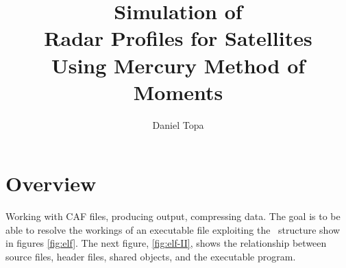 \documentclass[10pt, oneside]{article}   	%
\title{Simulation of \\Radar Profiles for Satellites \\Using Mercury Method of Moments}
\author{Daniel Topa\\\TopaHIIEmail}
\affil{\hiiafil}
\begin{document}
\maketitle
{}
\tableofcontents

\section{Overview}
\cite{topa20200303}
Working with CAF files, producing output, compressing data.
\cite{topa-4-20-2024}
\cite{topa-4-20-2024}
The goal is to be able to resolve the workings of an executable file exploiting the \elf \ structure show in figures \ref{fig:elf}. The next figure, \ref{fig:elf-II}, shows the relationship between source files, header files, shared objects, and the executable program.




			
			
			

	\printbibliography
%
% 
%
%
%
%
\end{document}

